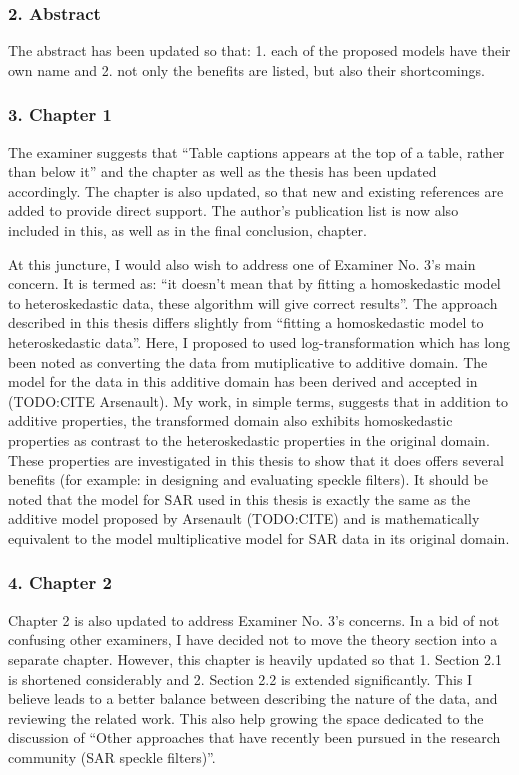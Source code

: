 \documentclass{article}
\begin{document}
\subsubsection*{2. Abstract}

The abstract has been updated so that: 1. each of the proposed models have their own name and 2. not only the benefits are listed, but also their shortcomings.

\subsubsection*{3. Chapter 1}

The examiner suggests that ``Table captions appears at the top of a table, rather than below it'' and the chapter as well as the thesis has been updated accordingly.
The chapter is also updated, so that new and existing references are added to provide direct support.
The author's publication list is now also included in this, as well as in the final conclusion, chapter.

At this juncture, I would also wish to address one of Examiner No. 3's main concern.
It is termed as: ``it doesn't mean that by fitting a homoskedastic model to heteroskedastic data, these algorithm will give correct results''.
The approach described in this thesis differs slightly from ``fitting a homoskedastic model to heteroskedastic data''.
Here, I proposed to used log-transformation which has long been noted as converting the data from mutiplicative to additive domain.
The model for the data in this additive domain has been derived and accepted in (TODO:CITE Arsenault).
My work, in simple terms, suggests that in addition to additive properties, the transformed domain also exhibits homoskedastic properties as contrast to the heteroskedastic properties in the original domain.
These properties are investigated in this thesis to show that it does offers several benefits (for example: in designing and evaluating speckle filters).
It should be noted that the model for SAR used in this thesis is exactly the same as the additive model proposed by Arsenault (TODO:CITE) and is mathematically equivalent to the model multiplicative model for SAR data in its original domain.

\subsubsection*{4. Chapter 2}

Chapter 2 is also updated to address Examiner No. 3's concerns.
In a bid of not confusing other examiners, I have decided not to move the theory section into a separate chapter.
However, this chapter is heavily updated so that 1. Section 2.1 is shortened considerably and 2. Section 2.2 is extended significantly. 
This I believe leads to a better balance between describing the nature of the data, and reviewing the related work.
This also help growing the space dedicated to the discussion of ``Other approaches that have recently been pursued in the research community (SAR speckle filters)''.
\end{document}
